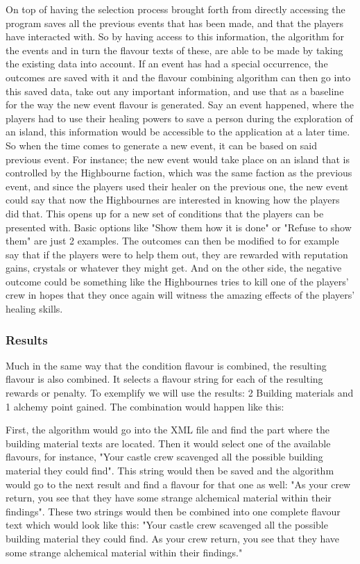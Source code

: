 On top of having the selection process brought forth from directly accessing the program saves all the previous events that has been made, and that the players have interacted with. So by having access to this information, the algorithm for the events and in turn the flavour texts of these, are able to be made by taking the existing data into account. If an event has had a special occurrence, the outcomes are saved with it and the flavour combining algorithm can then go into this saved data, take out any important information, and use that as a baseline for the way the new event flavour is generated. Say an event happened, where the players had to use their healing powers to save a person during the exploration of an island, this information would be accessible to the application at a later time. So when the time comes to generate a new event, it can be based on said previous event. For instance; the new event would take place on an island that is controlled by the Highbourne faction, which was the same faction as the previous event, and since the players used their healer on the previous one, the new event could say that now the Highbournes are interested in knowing how the players did that. This opens up for a new set of conditions that the players can be presented with. Basic options like "Show them how it is done" or "Refuse to show them" are just 2 examples. The outcomes can then be modified to for example say that if the players were to help them out, they are rewarded with reputation gains, crystals or whatever they might get. And on the other side, the negative outcome could be something like the Highbournes tries to kill one of the players' crew in hopes that they once again will witness the amazing effects of the players' healing skills.
\subsubsection{Results}
Much in the same way that the condition flavour is combined, the resulting flavour is also combined. It selects a flavour string for each of the resulting rewards or penalty. To exemplify we will use the results: 2 Building materials and 1 alchemy point gained.
The combination would happen like this:

First, the algorithm would go into the XML file and find the part where the building material texts are located. Then it would select one of the available flavours, for instance, "Your castle crew scavenged all the possible building material they could find". This string would then be saved and the algorithm would go to the next result and find a flavour for that one as well: "As your crew return, you see that they have some strange alchemical material within their findings". 
These two strings would then be combined into one complete flavour text which would look like this: "Your castle crew scavenged all the possible building material they could find. As your crew return, you see that they have some strange alchemical material within their findings."

